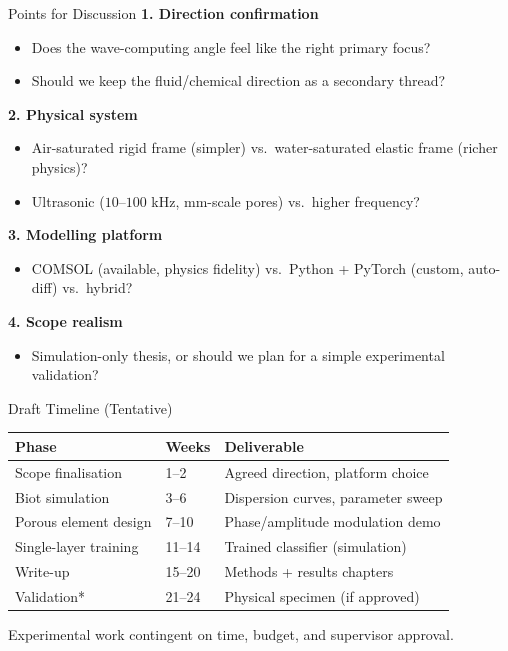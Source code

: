\documentclass[aspectratio=169,11pt]{beamer}
\begin{document}
\begin{frame}{Points for Discussion}
  \textbf{1. Direction confirmation}
  \begin{itemize}
    \item Does the wave-computing angle feel like the right primary focus?
    \item Should we keep the fluid/chemical direction as a secondary thread?
  \end{itemize}

  \textbf{2. Physical system}
  \begin{itemize}
    \item Air-saturated rigid frame (simpler) vs.\ water-saturated elastic frame (richer physics)?
    \item Ultrasonic ($10$--$100$ kHz, mm-scale pores) vs.\ higher frequency?
  \end{itemize}

  \textbf{3. Modelling platform}
  \begin{itemize}
    \item COMSOL (available, physics fidelity) vs.\ Python + PyTorch (custom, auto-diff) vs.\ hybrid?
  \end{itemize}

  \textbf{4. Scope realism}
  \begin{itemize}
    \item Simulation-only thesis, or should we plan for a simple experimental validation?
  \end{itemize}
\end{frame}

\begin{frame}{Draft Timeline (Tentative)}
  \begin{table}
    \centering
    \footnotesize
    \renewcommand{\arraystretch}{1.05}
    \begin{tabular}{@{}lll@{}}
      \toprule
      \textbf{Phase} & \textbf{Weeks} & \textbf{Deliverable} \\
      \midrule
      Scope finalisation & 1--2 & Agreed direction, platform choice \\
      Biot simulation & 3--6 & Dispersion curves, parameter sweep \\
      Porous element design & 7--10 & Phase/amplitude modulation demo \\
      Single-layer training & 11--14 & Trained classifier (simulation) \\
      Write-up & 15--20 & Methods + results chapters \\
      Validation* & 21--24 & Physical specimen (if approved) \\
      \bottomrule
    \end{tabular}
  \end{table}

  \vspace{0.1cm}
  \textcolor{gdpSlate}{\small *Experimental work contingent on time, budget, and supervisor approval.}
\end{frame}
\end{document}
